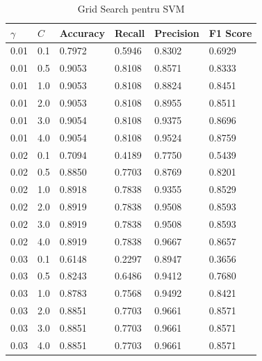 \begin{table}[H]
    \centering
    \begin{tabularx}{\textwidth}{
        |X
        |X
        |X
        |X
        |X
        |X|
    }
    \hline
    $\gamma$ & $C$ & {Accuracy} & {Recall} & {Precision} & {F1 Score} \\
    \hline
    \rowcolor{gray!20} 0.01 & 0.1 & 0.7972 & 0.5946 & 0.8302 & 0.6929 \\
    0.01 & 0.5 & 0.9053 & 0.8108 & 0.8571 & 0.8333 \\
    \rowcolor{gray!20} 0.01 & 1.0 & 0.9053 & 0.8108 & 0.8824 & 0.8451 \\
    0.01 & 2.0 & 0.9053 & 0.8108 & 0.8955 & 0.8511 \\
    \rowcolor{gray!20} 0.01 & 3.0 & 0.9054 & 0.8108 & 0.9375 & 0.8696 \\
    0.01 & 4.0 & 0.9054 & 0.8108 & 0.9524 & 0.8759 \\
    \rowcolor{gray!20} 0.02 & 0.1 & 0.7094 & 0.4189 & 0.7750 & 0.5439 \\
    0.02 & 0.5 & 0.8850 & 0.7703 & 0.8769 & 0.8201 \\
    \rowcolor{gray!20} 0.02 & 1.0 & 0.8918 & 0.7838 & 0.9355 & 0.8529 \\
    0.02 & 2.0 & 0.8919 & 0.7838 & 0.9508 & 0.8593 \\
    \rowcolor{gray!20} 0.02 & 3.0 & 0.8919 & 0.7838 & 0.9508 & 0.8593 \\
    0.02 & 4.0 & 0.8919 & 0.7838 & 0.9667 & 0.8657 \\
    \rowcolor{gray!20} 0.03 & 0.1 & 0.6148 & 0.2297 & 0.8947 & 0.3656 \\
    0.03 & 0.5 & 0.8243 & 0.6486 & 0.9412 & 0.7680 \\
    \rowcolor{gray!20} 0.03 & 1.0 & 0.8783 & 0.7568 & 0.9492 & 0.8421 \\
    0.03 & 2.0 & 0.8851 & 0.7703 & 0.9661 & 0.8571 \\
    \rowcolor{gray!20} 0.03 & 3.0 & 0.8851 & 0.7703 & 0.9661 & 0.8571 \\
    0.03 & 4.0 & 0.8851 & 0.7703 & 0.9661 & 0.8571 \\
    \hline
    \end{tabularx}
    \caption{Grid Search pentru SVM}
\end{table}
  